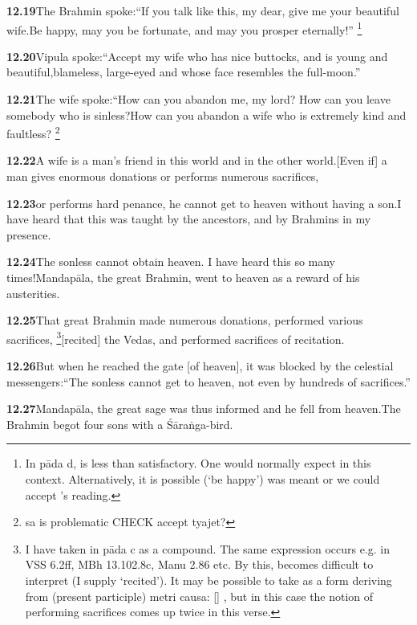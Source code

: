 \textbf{12.19}The Brahmin spoke:``If you talk like this, my dear, give me your beautiful wife.Be happy, may you be fortunate, and may you prosper eternally!''%
\footnote{In pāda d,  is less than satisfactory. One would normally expect                   in this context. Alternatively, it is possible                  (`be happy') was meant or we could accept \Ed's reading.  }%


\textbf{12.20}Vipula spoke:``Accept my wife who has nice buttocks, and is young and beautiful,blameless, large-eyed and whose face resembles the full-moon.''%


\textbf{12.21}The wife spoke:``How can you abandon me, my lord? How can you leave somebody who is sinless?How can you abandon a wife who is extremely kind and faultless?%
\footnote{sa is problematic CHECK accept tyajet?  }%


\textbf{12.22}A wife is a man's friend in this world and in the other world.[Even if] a man gives enormous donations or performs numerous sacrifices,%


\textbf{12.23}or performs hard penance, he cannot get to heaven without having a son.I have heard that this was taught by the ancestors, and by Brahmins in my presence.%


\textbf{12.24}The sonless cannot obtain heaven. I have heard this so many times!Mandapāla, the great Brahmin, went to heaven as a reward of his austerities.%


\textbf{12.25}That great Brahmin made numerous donations, performed various sacrifices,%
\footnote{I have taken  in pāda c as a  compound.                  The same expression occurs e.g. in VSS 6.2ff, MBh 13.102.8c, Manu 2.86 etc.                 By this,  becomes difficult to interpret (I supply `recited'). It may be possible to take                  as a form deriving from  (present participle) metri causa:                         [] , but in this case                          the notion of performing sacrifices comes up twice in this verse.  }[recited] the Vedas, and performed sacrifices of recitation.%


\textbf{12.26}But when he reached the gate [of heaven], it was blocked by the celestial messengers:``The sonless cannot get to heaven, not even by hundreds of sacrifices.''%


\textbf{12.27}Mandapāla, the great sage was thus informed and he fell from heaven.The Brahmin begot four sons with a Śāraṅga-bird.%


